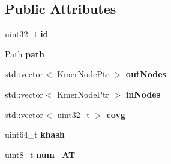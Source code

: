 \subsection*{Public Attributes}
\begin{DoxyCompactItemize}
\item 
\mbox{\label{classKmerNode_a6803750cbbfc585789c2bf7ca5a3983c}} 
uint32\+\_\+t {\bfseries id}
\item 
\mbox{\label{classKmerNode_ae1eca64526c5d953d747c1cfec36d1d1}} 
Path {\bfseries path}
\item 
\mbox{\label{classKmerNode_a387fae3534ffb286a08e01d7a4c55860}} 
std\+::vector$<$ Kmer\+Node\+Ptr $>$ {\bfseries out\+Nodes}
\item 
\mbox{\label{classKmerNode_afedd1f37b1a6a505db0bf8c35cc5bb2d}} 
std\+::vector$<$ Kmer\+Node\+Ptr $>$ {\bfseries in\+Nodes}
\item 
\mbox{\label{classKmerNode_a318e7a8b463dd4dc32a1ce0596fde4b2}} 
std\+::vector$<$ uint32\+\_\+t $>$ {\bfseries covg}
\item 
\mbox{\label{classKmerNode_a1249f454401dd6748834f3b621a8e58c}} 
uint64\+\_\+t {\bfseries khash}
\item 
\mbox{\label{classKmerNode_a8b93c5f2fd1b524462bf83074e3e0915}} 
uint8\+\_\+t {\bfseries num\+\_\+\+AT}
\end{DoxyCompactItemize}
